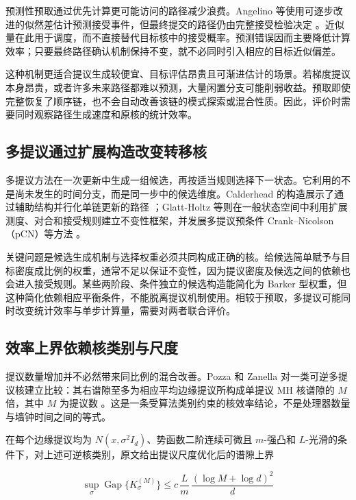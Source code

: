 \documentclass[UTF8,a4paper,zihao=-4,fontset=fandol]{ctexart}
\begin{document}
预测性预取通过优先计算更可能访问的路径减少浪费。Angelino 等使用可逐步改进的似然差估计预测接受事件，但最终提交的路径仍由完整接受检验决定 \cite{angelino2014}。近似量在此用于调度，而不直接替代目标核中的接受概率。预测错误因而主要降低计算效率；只要最终路径确认机制保持不变，就不必同时引入相应的目标近似偏差。

这种机制更适合提议生成较便宜、目标评估昂贵且可渐进估计的场景。若梯度提议本身昂贵，或者许多未来路径都难以预测，大量闲置分支可能削弱收益。预取即使完整恢复了顺序链，也不会自动改善该链的模式探索或混合性质。因此，评价时需要同时观察路径生成速度和原核的统计效率。

\subsection{多提议通过扩展构造改变转移核}

多提议方法在一次更新中生成一组候选，再按适当规则选择下一状态。它利用的不是尚未发生的时间分支，而是同一步中的候选维度。Calderhead 的构造展示了通过辅助结构并行化单链更新的路径 \cite{calderhead2014}；Glatt-Holtz 等则在一般状态空间中利用扩展测度、对合和接受规则建立不变性框架，并发展多提议预条件 Crank–Nicolson（pCN）等方法 \cite{glattholtz2024}。

关键问题是候选生成机制与选择权重必须共同构成正确的核。给候选简单赋予与目标密度成比例的权重，通常不足以保证不变性，因为提议密度及候选之间的依赖也会进入接受规则。某些两阶段、条件独立的候选构造能简化为 Barker 型权重，但这种简化依赖相应平衡条件，不能脱离提议机制使用。相较于预取，多提议可能同时改变统计效率与单步计算量，需要对两者联合评价。

\subsection{效率上界依赖核类别与尺度}

提议数量增加并不必然带来同比例的混合改善。Pozza 和 Zanella 对一类可逆多提议核建立比较：其右谱隙至多为相应平均边缘提议所构成单提议 MH 核谱隙的 $M$ 倍，其中 $M$ 为提议数 \cite{pozza2025}。这是一条受算法类别约束的核效率结论，不是处理器数量与墙钟时间之间的等式。

在每个边缘提议均为 $N(x,\sigma^2 I_d)$、势函数二阶连续可微且 $m$-强凸和 $L$-光滑的条件下，对上述可逆核类别，原文给出提议尺度优化后的谱隙上界

\begin{equation}
\sup_{\sigma}\operatorname{Gap}\{K_{\sigma}^{(M)}\}
\leq c\,\frac{L}{m}\,
\frac{(\log M+\log d)^2}{d}
\label{eq:6}
\end{equation}
\end{document}
